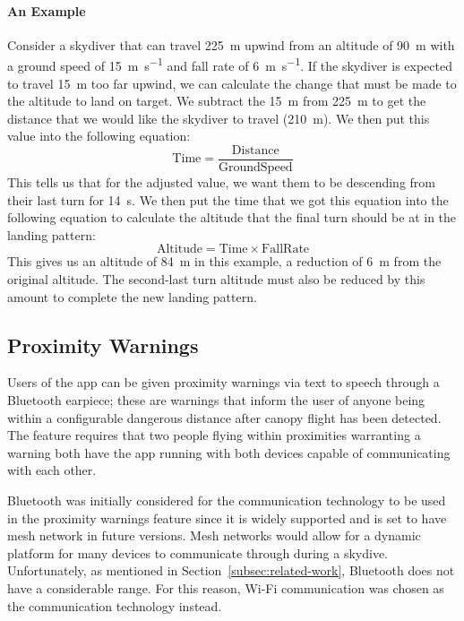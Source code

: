 \paragraph{An Example}
Consider a skydiver that can travel \SI{225}{\metre} upwind from an altitude of \SI{90}{\metre} with a ground speed of \SI{15}{\metre\per\second} and fall rate of \SI{6}{\metre\per\second}. If the skydiver is expected to travel \SI{15}{\metre} too far upwind, we can calculate the change that must be made to the altitude to land on target. We subtract the \SI{15}{\metre} from \SI{225}{\metre} to get the distance that we would like the skydiver to travel (\SI{210}{\metre}). We then put this value into the following equation:
\begin{equation}
  \mathrm{Time} = \frac{\mathrm{Distance}}{\mathrm{Ground Speed}}
\end{equation}
This tells us that for the adjusted value, we want them to be descending from their last turn for
\SI{14}{\second}.
We then put the time that we got this equation into the following equation to calculate the altitude that the final turn should be at in the landing pattern:
\begin{equation}
  \mathrm{Altitude} = \mathrm{Time} \times \mathrm{Fall Rate}
\end{equation}
This gives us an altitude of \SI{84}{\metre} in this example, a reduction of \SI{6}{\metre} from the original altitude. The second-last turn altitude must also be reduced by this amount to complete the new landing pattern.

\subsection{Proximity Warnings}
Users of the app can be given proximity warnings via text to speech through a Bluetooth earpiece; these are warnings that inform the user of anyone being within a configurable dangerous distance after canopy flight has been detected.
The feature requires that two people flying within proximities warranting a warning both have the app running with both devices capable of communicating with each other.

Bluetooth was initially considered for the communication technology to be used in the proximity warnings feature since it is widely supported and is set to have mesh network in future versions. Mesh networks would allow for a dynamic platform for many devices to communicate through during a skydive. Unfortunately, as mentioned in Section~\ref{subsec:related-work}, Bluetooth does not have a considerable range. For this reason, Wi-Fi communication was chosen as the communication technology instead.


